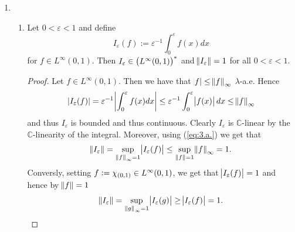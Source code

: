 \begin{enumerate}[label = \textbf{Exercise \arabic*.},wide = 0pt, itemsep = 1.5ex]
	\item 
		~
		\begin{enumerate}[label = \textbf{\alph*.},wide = 0pt, itemsep = 1.5ex]
			\item 
				\begin{lemma}
					Let $0 < \varepsilon < 1$ and define 
					\begin{equation*}
						I_\varepsilon(f) := \varepsilon^{-1}\int_0^\varepsilon f(x) dx
					\end{equation*}
					\noindent for $f \in L^\infty(0,1)$. Then $I_\varepsilon \in \del[1]{L^\infty(0,1)}^*$ and $\norm{I_\varepsilon} = 1$ for all $0 < \varepsilon < 1$.
				\end{lemma}

				\begin{proof}
					 Let $f \in L^\infty(0,1)$. Then we have that $\abs{f} \leq \norm{f}_\infty$ $\lambda$-a.e. Hence 
					 \begin{equation}
						 \abs[0]{I_\varepsilon(f)} = \varepsilon^{-1} \abs[3]{\int_0^\varepsilon f(x) dx} \leq \varepsilon^{-1} \int_0^\varepsilon \abs{f(x)}dx \leq \norm{f}_\infty
						 \label{eq:3.a.}
					 \end{equation}
					 \noindent and thus $I_\varepsilon$ is bounded and thus continuous. Clearly $I_\varepsilon$ is $\mathbb{C}$-linear by the $\mathbb{C}$-linearity of the integral. Moreover, using (\ref{eq:3.a.}) we get that
					 \begin{equation*}
						 \norm{I_\varepsilon} = \sup_{\norm[0]{f}_\infty = 1}\abs{I_\varepsilon(f)} \leq \sup_{\norm[0]{f} = 1}\norm{f}_\infty = 1.
					 \end{equation*}
					 Conversly, setting $f := \chi_{\intoo{0,1}} \in L^\infty(0,1)$, we get that $\abs{I_\varepsilon(f)} = 1$ and hence by $\norm{f} = 1$
					 \begin{equation*}
						 \norm{I_\varepsilon} = \sup_{\norm[0]{g}_\infty = 1} \abs{I_\varepsilon(g)} \geq \abs{I_\varepsilon(f)} = 1. 
					 \end{equation*}
				\end{proof}
		\end{enumerate}


\end{enumerate}
